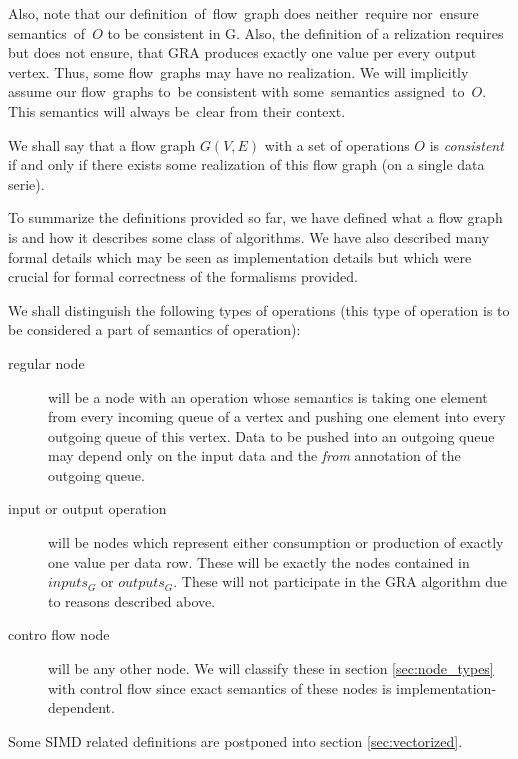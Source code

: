 Also, note that our definition~of~flow~graph does neither~require nor~ensure semantics~of~$O$ to be consistent in G. Also, the definition of a relization requires but does not ensure, that GRA produces exactly one value per every output vertex. Thus, some flow~graphs may have no realization. We will implicitly assume our flow~graphs to~be consistent with some~semantics assigned~to~$O$. This semantics will always be~clear from their context.


\begin{define}
  We shall say that a flow graph $G(V,E)$ with a set of operations $O$ is \emph{consistent} if and only if there exists some realization of this flow graph (on a single data serie). 
\end{define}


To summarize the definitions provided so far, we have defined what a flow graph is and how it describes some class of algorithms. We have also described many formal details which may be seen as implementation details but which were crucial for formal correctness of the formalisms provided.

\begin{define}
  \label{sec:node_types0}
  \label{def:node_types0}
  We shall distinguish the following types of operations (this type of operation is to be considered a part of semantics of operation):
\begin{description}
  \item [regular node] will be a node with an operation whose semantics is taking one element from every incoming queue of a vertex and pushing one element into every outgoing queue of this vertex. Data to be pushed into an outgoing queue may depend only on the input data and the \emph{from} annotation of the outgoing queue.
\item [input or output operation] will be nodes which represent either consumption or production of exactly one value per data row.  These will be exactly the nodes contained in $inputs_G$ or $outputs_G$. These will not participate in the GRA algorithm due to reasons described above.
\item [contro flow node] will be any other node. We will classify these in section \ref{sec:node_types} with control flow since exact semantics of these nodes is implementation-dependent. 
\end{description}
\end{define}
  
  Some SIMD related definitions are postponed into section \ref{sec:vectorized}.

